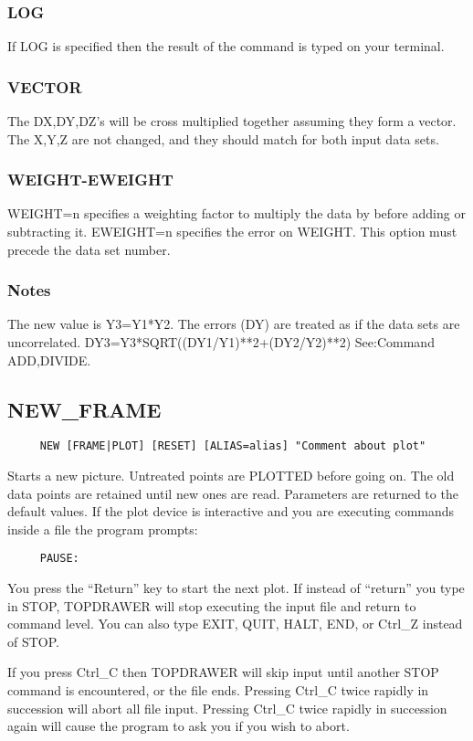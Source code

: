 \subsubsection{LOG}
If  LOG  is  specified  then the result of the command is typed on your
terminal.  
\subsubsection{VECTOR}
The  DX,DY,DZ's  will be cross multiplied together assuming they form a
vector.  The X,Y,Z are not changed, and  they  should  match  for  both
input data sets.  
\subsubsection{WEIGHT-EWEIGHT}
WEIGHT=n  specifies  a  weighting factor to multiply the data by before
adding or subtracting it.  EWEIGHT=n specifies  the  error  on  WEIGHT.
This option must precede the data set number.  
\subsubsection{Notes}
The  new value is Y3=Y1*Y2.  The errors (DY) are treated as if the data
sets    are     uncorrelated.      DY3=Y3*SQRT((DY1/Y1)**2+(DY2/Y2)**2)
See:Command ADD,DIVIDE.  
\subsection{NEW\_FRAME}
\begin{verbatim}
     NEW [FRAME|PLOT] [RESET] [ALIAS=alias] "Comment about plot" 
\end{verbatim}
Starts a new picture.  Untreated points are PLOTTED before going on.  The
old data points are retained until new ones  are  read.   Parameters  are
returned  to  the  default values.  If the plot device is interactive and
you are executing commands inside a file the program prompts:  
\begin{verbatim}
     PAUSE:  
\end{verbatim}
You  press  the  ``Return''  key  to  start  the  next plot.  If instead of
``return'' you type in STOP, TOPDRAWER will stop executing the  input  file
and return to command level.  You can also type EXIT, QUIT, HALT, END, or
Ctrl\_Z instead of STOP.  

If  you  press  Ctrl\_C  then TOPDRAWER will skip input until another STOP
command is encountered, or the file ends.  Pressing Ctrl\_C twice  rapidly
in  succession  will abort all file input.  Pressing Ctrl\_C twice rapidly
in succession again will cause the program to ask  you  if  you  wish  to
abort.  
